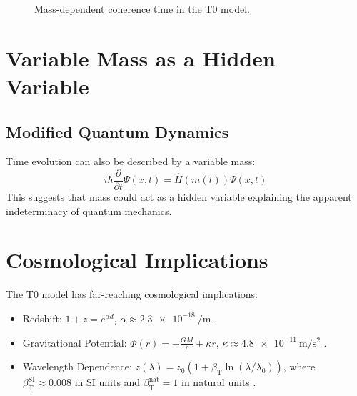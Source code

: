 \documentclass[12pt,a4paper]{article}
\newcommand{\betaT}{\beta_{\text{T}}}
\begin{document}
	\begin{figure}[h]
		\centering
		\caption{Mass-dependent coherence time in the T0 model.}
	\end{figure}
	
	\section{Variable Mass as a Hidden Variable}
	\subsection{Modified Quantum Dynamics}
	Time evolution can also be described by a variable mass:
	\begin{equation}
		i\hbar \frac{\partial}{\partial t}\Psi(x,t) = \hat{H}(m(t))\Psi(x,t)
	\end{equation}
	This suggests that mass could act as a hidden variable explaining the apparent indeterminacy of quantum mechanics.
	
	\section{Cosmological Implications}
	The T0 model has far-reaching cosmological implications:
	\begin{itemize}
		\item Redshift: \( 1 + z = e^{\alpha d} \), \(\alpha \approx \SI{2.3e-18}{\per\meter}\) \cite{pascher_lagrange_2025}.
		\item Gravitational Potential: \(\Phi(r) = -\frac{G M}{r} + \kappa r\), \(\kappa \approx \SI{4.8e-11}{\meter\per\second\squared}\) \cite{pascher_lagrange_2025}.
		\item Wavelength Dependence: \( z(\lambda) = z_0 (1 + \betaT \ln(\lambda/\lambda_0)) \), where \(\betaT^{\text{SI}} \approx 0.008\) in SI units and \(\betaT^{\text{nat}} = 1\) in natural units \cite{pascher_params_2025}.
	\end{itemize}
	
\end{document}
